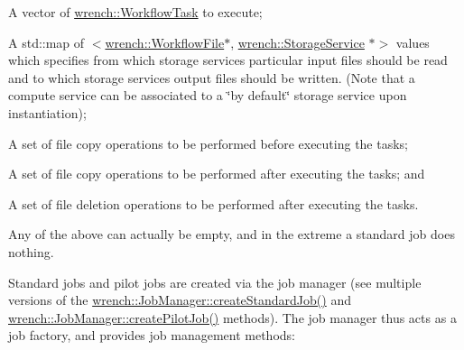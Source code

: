 \begin{DoxyItemize}
\item A vector of {\ttfamily \hyperlink{classwrench_1_1_workflow_task}{wrench\+::\+Workflow\+Task}} to execute;
\item A {\ttfamily std\+::map} of {\ttfamily $<$\hyperlink{classwrench_1_1_workflow_file}{wrench\+::\+Workflow\+File}$\ast$, \hyperlink{classwrench_1_1_storage_service}{wrench\+::\+Storage\+Service} $\ast$$>$} values which specifies from which storage services particular input files should be read and to which storage services output files should be written. (Note that a compute service can be associated to a \char`\"{}by default\char`\"{} storage service upon instantiation);
\item A set of file copy operations to be performed before executing the tasks;
\item A set of file copy operations to be performed after executing the tasks; and
\item A set of file deletion operations to be performed after executing the tasks.
\end{DoxyItemize}

Any of the above can actually be empty, and in the extreme a standard job does nothing.

Standard jobs and pilot jobs are created via the job manager (see multiple versions of the {\ttfamily \hyperlink{classwrench_1_1_job_manager_a7f3873e56c8813c90b66683690d6b328}{wrench\+::\+Job\+Manager\+::create\+Standard\+Job()}} and {\ttfamily \hyperlink{classwrench_1_1_job_manager_a9ef786306730359866e3fd2bd3aadaf7}{wrench\+::\+Job\+Manager\+::create\+Pilot\+Job()}} methods). The job manager thus acts as a job factory, and provides job management methods\+:


